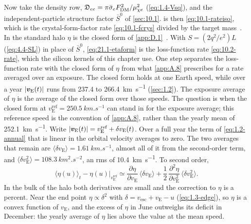 Now take the density row, $\mathfrak{D}_{ee} = \pi\bar{\sigma}_{e}F_{\mathrm{DM}}^2/\mu_{\chi e}^2$ (\cref{eq:1.4-Vsq}), and the independent-particle structure factor $\bar S^0$ of \cref{sec:10.1}.  is then \cref{eq:10.1-rateiso}, which is the crystal-form-factor rate \cref{eq:10.1-fcrys} divided by the target mass~\cite[Eqs.~(3.13), (3.17)]{essig2016direct}. In the standard halo $\eta$ is the closed form of \cref{app:D.1}~\cite[App.~B]{essig2016direct}. With $S = (2q^2/e^2)L$ (\cref{eq:4.4-SL}) in place of $\bar S^0$, \cref{eq:21.1-etaform} is the loss-function rate \cref{eq:10.2-rate}, which the silicon kernels of this chapter use. One step separates the loss-function rate with the closed form of $\eta$ from what \cref{app:A.8} prescribes for a rate averaged over an exposure. The closed form holds at one Earth speed, while over a year $|\bm{v}_{\mathrm{E}}(t)|$ runs from 237.4 to \SI{266.4}{km.s^{-1}} (\cref{sec:1.2}). The exposure average of $\eta$ is the average of the closed form over those speeds. The question is when the closed form at $v_{\mathrm{E}}^{\mathrm{ref}} = \SI{250.5}{km.s^{-1}}$ can stand in for the exposure average; this reference speed is the convention of \cref{app:A.8}, rather than the yearly mean of \SI{252.1}{km.s^{-1}}. Write $|\bm{v}_{\mathrm{E}}(t)| = v_{\mathrm{E}}^{\mathrm{ref}} + \delta v_{\mathrm{E}}(t)$. Over a full year the term of \cref{eq:1.2-annual} that is linear in the orbital velocity averages to zero. The two averages that remain are $\langle\delta v_{\mathrm{E}}\rangle = \SI{1.61}{km.s^{-1}}$, almost all of it from the second-order term, and $\langle\delta v_{\mathrm{E}}^2\rangle = \SI{108.3}{km^2.s^{-2}}$, an rms of \SI{10.4}{km.s^{-1}}. To second order,
\begin{equation}
  \langle\eta(u)\rangle_t - \eta(u)\big|_{v_{\mathrm{E}}^{\mathrm{ref}}} \simeq \frac{\partial\eta}{\partial v_{\mathrm{E}}}\,\langle\delta v_{\mathrm{E}}\rangle + \frac12\,\frac{\partial^2\eta}{\partial v_{\mathrm{E}}^2}\,\langle\delta v_{\mathrm{E}}^2\rangle .
  \label{eq:21.1-annualcorr}
\end{equation}
In the bulk of the halo both derivatives are small and the correction to $\eta$ is a percent. Near the end point $\eta \propto \delta^2$ with $\delta = v_{\mathrm{esc}} + v_{\mathrm{E}} - u$ (\cref{eq:1.3-edge}), so $\eta$ is a convex function of $v_{\mathrm{E}}$, and the excess of $\eta$ in June outweighs its deficit in December: the yearly average of $\eta$ lies above the value at the mean speed.
